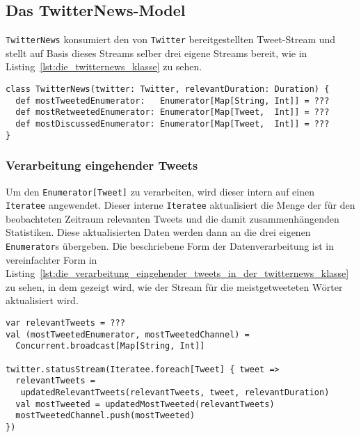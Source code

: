 
\subsection{Das TwitterNews-Model} %
\label{sub:die_twitternews_klasse}

\lstinline|TwitterNews| konsumiert den von \lstinline|Twitter| bereitgestellten Tweet-Stream und stellt auf Basis dieses Streams selber drei eigene Streams bereit, wie in Listing~\ref{lst:die_twitternews_klasse} zu sehen.

\begin{lstlisting}[caption=Die TwitterNews-Klasse, label=lst:die_twitternews_klasse]
class TwitterNews(twitter: Twitter, relevantDuration: Duration) {
  def mostTweetedEnumerator:   Enumerator[Map[String, Int]] = ???
  def mostRetweetedEnumerator: Enumerator[Map[Tweet,  Int]] = ???
  def mostDiscussedEnumerator: Enumerator[Map[Tweet,  Int]] = ???
}
\end{lstlisting}

\subsubsection{Verarbeitung eingehender Tweets} %
\label{ssub:verarbeitung_eingehender_tweets}

Um den \lstinline|Enumerator[Tweet]| zu verarbeiten, wird dieser intern auf einen \lstinline|Iteratee| angewendet.
Dieser interne \lstinline|Iteratee| aktualisiert die Menge der für den beobachteten Zeitraum relevanten Tweets und die damit zusammenhängenden Statistiken.
Diese aktualisierten Daten werden dann an die drei eigenen \lstinline|Enumerator|s übergeben.
Die beschriebene Form der Datenverarbeitung ist in vereinfachter Form in Listing~\ref{lst:die_verarbeitung_eingehender_tweets_in_der_twitternews_klasse} zu sehen, in dem gezeigt wird, wie der Stream für die meistgetweeteten Wörter aktualisiert wird.

\begin{lstlisting}[caption=Die Verarbeitung eingehender Tweets in der TwitterNews-Klasse, label=lst:die_verarbeitung_eingehender_tweets_in_der_twitternews_klasse]
var relevantTweets = ???
val (mostTweetedEnumerator, mostTweetedChannel) =
  Concurrent.broadcast[Map[String, Int]]

twitter.statusStream(Iteratee.foreach[Tweet] { tweet =>
  relevantTweets =
   updatedRelevantTweets(relevantTweets, tweet, relevantDuration)
  val mostTweeted = updatedMostTweeted(relevantTweets)
  mostTweetedChannel.push(mostTweeted)
})
\end{lstlisting}

